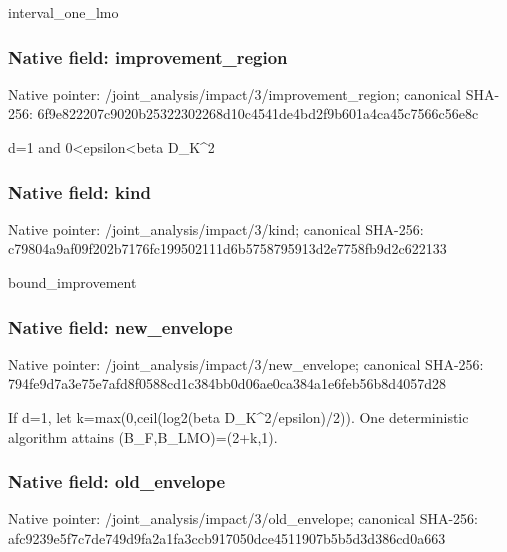 \documentclass[10pt,a4paper]{article}
\begin{document}
\begingroup\raggedright\sloppy interval\_\allowbreak{}one\_\allowbreak{}lmo\par\endgroup

\subsubsection{Native field: improvement\_\allowbreak{}region}
Native pointer: /joint\_\allowbreak{}analysis/impact/3/improvement\_\allowbreak{}region; canonical SHA-256: 6f9e822207c9020b25322302268d10c4541de4bd2f9b601a4ca45c7566c56e8c

\begingroup\raggedright\sloppy d=\allowbreak{}1 and 0<epsilon<beta D\_\allowbreak{}K\textasciicircum{}2\par\endgroup

\subsubsection{Native field: kind}
Native pointer: /joint\_\allowbreak{}analysis/impact/3/kind; canonical SHA-256: c79804a9af09f202b7176fc199502111d6b5758795913d2e7758fb9d2c622133

\begingroup\raggedright\sloppy bound\_\allowbreak{}improvement\par\endgroup

\subsubsection{Native field: new\_\allowbreak{}envelope}
Native pointer: /joint\_\allowbreak{}analysis/impact/3/new\_\allowbreak{}envelope; canonical SHA-256: 794fe9d7a3e75e7afd8f0588cd1c384bb0d06ae0ca384a1e6feb56b8d4057d28

\begingroup\raggedright\sloppy If d=\allowbreak{}1,\allowbreak{} let k=\allowbreak{}max(0,\allowbreak{}ceil(log2(beta D\_\allowbreak{}K\textasciicircum{}2/\allowbreak{}epsilon)/\allowbreak{}2)). One deterministic algorithm attains (B\_\allowbreak{}F,\allowbreak{}B\_\allowbreak{}LMO)=\allowbreak{}(2+k,\allowbreak{}1).\par\endgroup

\subsubsection{Native field: old\_\allowbreak{}envelope}
Native pointer: /joint\_\allowbreak{}analysis/impact/3/old\_\allowbreak{}envelope; canonical SHA-256: afc9239e5f7c7de749d9fa2a1fa3ccb917050dce4511907b5b5d3d386cd0a663
\end{document}
